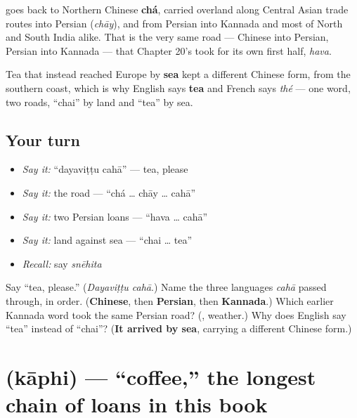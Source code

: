 \begin{cousinweb}
\textbf{} goes back to Northern Chinese \textbf{chá}, carried overland along Central Asian trade routes into Persian \textbf{} (\emph{chāy}), and from Persian into Kannada and most of North and South India alike. That is the very same road — Chinese into Persian, Persian into Kannada — that Chapter 20's \textbf{} took for its own first half, \emph{hava}.

Tea that instead reached Europe by \textbf{sea} kept a different Chinese form, from the southern coast, which is why English says \textbf{tea} and French says \emph{thé} — one word, two roads, \textquotedblleft{}chai\textquotedblright{} by land and \textquotedblleft{}tea\textquotedblright{} by sea.
\end{cousinweb}

\subsection*{Your turn}
\begin{itemize}
\raggedright
  \item \emph{Say it:} \textquotedblleft{}dayaviṭṭu cahā\textquotedblright{} — tea, please
  \item \emph{Say it:} the road — \textquotedblleft{}chá … chāy … cahā\textquotedblright{}
  \item \emph{Say it:} two Persian loans — \textquotedblleft{}hava … cahā\textquotedblright{}
  \item \emph{Say it:} land against sea — \textquotedblleft{}chai … tea\textquotedblright{}
  \item \emph{Recall:} say \emph{snēhita}
\end{itemize}

\begin{tcolorbox}[breakable,colback=teal!4,colframe=teal!35!black,title={Before you move on}]
Say \textquotedblleft{}tea, please.\textquotedblright{} (\emph{Dayaviṭṭu cahā}.) Name the three languages \emph{cahā} passed through, in order. (\textbf{Chinese}, then \textbf{Persian}, then \textbf{Kannada}.) Which earlier Kannada word took the same Persian road? (\emph{\textbf{}}, weather.) Why does English say \textquotedblleft{}tea\textquotedblright{} instead of \textquotedblleft{}chai\textquotedblright{}? (\textbf{It arrived by sea}, carrying a different Chinese form.)
\end{tcolorbox}
\section[\texorpdfstring{\kn{ಕಾಫಿ} (kāphi)}{ಕಾಫಿ (kāphi)}]{ (kāphi) — \textquotedblleft{}coffee,\textquotedblright{} the longest chain of loans in this book}

